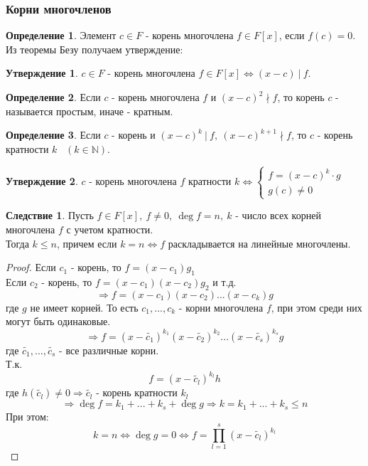 \documentclass[a4paper, 12pt]{article}
\newcommand{\N}{\mathbb N}
\newcommand\tab[1][.5cm]{\hspace*{#1}}
\theoremstyle{definition}
\newtheorem*{definition}{Определение}
\newtheorem*{consequense}{Следствие}
\newtheorem*{subtheorem}{Утверждение}
\begin{document}
  \subsubsection{Корни многочленов}
  \begin{definition}
    Элемент $c\in F$ - корень многочлена $f \in F[x]$, если $f(c) = 0$. Из теоремы Безу получаем утверждение: 
  \end{definition}
  \begin{subtheorem}
    $c \in F$ - корень многочлена $f\in F[x] \Longleftrightarrow (x-c) \ | \ f$.  
  \end{subtheorem}  
  \begin{definition}
    Если $c$ - корень многочлена $f$ и $(x-c)^2 \nmid f$, то корень $c$ - называется простым, иначе - кратным.
  \end{definition} 
  \begin{definition}
    Если $c$ - корень и $(x-c)^k \ | \ f, \ (x-c)^{k+1} \nmid f$, то $c$ - корень кратности $k$ \ $(k \in \N)$.     
  \end{definition} 
  \begin{subtheorem}
    $c$ - корень многочлена $f$ кратности $k \Longleftrightarrow \begin{cases}
      f = (x-c)^k \cdot g\\
      g(c) \neq 0
    \end{cases}$  
  \end{subtheorem} 
  \begin{consequense}
    Пусть $f \in F[x], \ f \neq 0, \ \deg f = n, \ k$ - число всех корней многочлена $f$ с учетом кратности. \\
    Тогда $k\leq n$, причем если $k=n \Longleftrightarrow f$ раскладывается на линейные многочлены.    
  \end{consequense}
  \begin{proof}
    Если $c_1$ - корень, то $f = (x-c_1)g_1$ \\
    \tab[4.1cm]Если $c_2$ - корень, то $f = (x-c_1)(x-c_2)g_2$ и т.д. 
    $$\Longrightarrow f = (x-c_1)(x-c_2)...(x-c_k)g$$
    где $g$ не имеет корней. То есть $c_1,...,c_k$ - корни многочлена $f$, при этом среди них могут быть одинаковые.
    $$\Longrightarrow f = (x-\widetilde{c_1})^{k_1}(x-\widetilde{c_2})^{k_2}...(x-\widetilde{c_s})^{k_s}g$$
    где $\widetilde{c_1},...,\widetilde{c_s}$ - все различные корни.\\ 
    Т.к. $$f = (x-\widetilde{c_l})^{k_l} h$$ 
    где $h(\widetilde{c_l}) \neq 0 \Longrightarrow \widetilde{c_l}$ - корень кратности $k_l$ $$\Longrightarrow \deg f = k_1 +...+k_s + \deg g \Longrightarrow k = k_1+...+k_s \leq n$$
    При этом: $$k=n \Longleftrightarrow \deg g =0 \Longleftrightarrow f = \prod\limits_{l=1}^{s}(x-\widetilde{c_l})^{k_l}$$       
  \end{proof}
\end{document}
